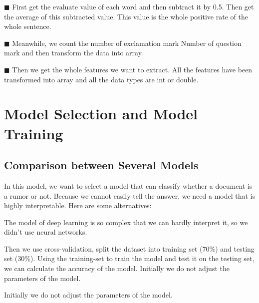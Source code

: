 \documentclass[12pt,a4paper]{article}
\begin{document}
 \setlength{\hangindent}{4em}
$\blacksquare$ First get the evaluate value of each word and then subtract it by 0.5. Then get the average of this subtracted value. This value is the whole positive rate of the whole sentence.

 \setlength{\hangindent}{4em}
$\blacksquare$ Meanwhile, we count the number of exclamation mark Number of question mark and then transform the data into array.

 \setlength{\hangindent}{4em}
$\blacksquare$ Then we get the whole features we want to extract. All the features have been transformed into array and all the data types are int or double. 


\section{Model Selection and Model Training}
\subsection{Comparison between Several Models}
In this model, we want to select a model that can classify whether a document is a rumor or not.
Because we cannot easily tell the answer, we need a model that is highly interpretable.  Here are some alternatives:

\vspace{10pt}
\setlength{\parindent}{5em}
\vspace{10pt}

\setlength{\parindent}{2em}
The model of deep learning is so complex that we can hardly interpret it, so we didn't use neural networks.

Then we use cross-validation, split the dataset into training set (70\%) and testing set (30\%). Using the training-set to train the model and test it on the testing set, we can calculate the accuracy of the model. 
Initially we do not adjust the parameters of the model. 

Initially we do not adjust the parameters of the model. 
\end{document}
